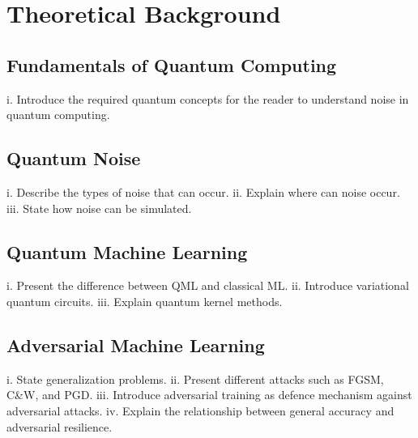 \chapter{Theoretical Background}\label{chapter:background}

\section{Fundamentals of Quantum Computing}
i.	Introduce the required quantum concepts for the reader to understand noise in quantum computing.

\section{Quantum Noise}
i.	Describe the types of noise that can occur.
ii.	Explain where can noise occur.
iii.	State how noise can be simulated.

\section{Quantum Machine Learning}
i.	Present the difference between QML and classical ML\@.
ii.	Introduce variational quantum circuits.
iii.	Explain quantum kernel methods.

\section{Adversarial Machine Learning}
i.	State generalization problems.
ii.	Present different attacks such as FGSM, C\&W, and PGD\@.
iii.	Introduce adversarial training as defence mechanism against adversarial attacks.
iv.	Explain the relationship between general accuracy and adversarial resilience.